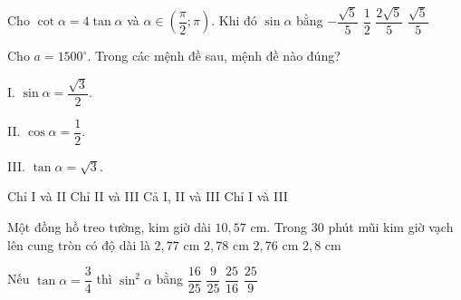 \begin{ex}%
Cho $\cot \alpha =4\tan \alpha$ và $\alpha \in \left(\dfrac{\pi}{2};\pi \right)$. Khi đó $\sin \alpha$ bằng
\choice
{$-\dfrac{\sqrt{5}}{5}$}
{$\dfrac{1}{2}$}
{$\dfrac{2\sqrt{5}}{5}$}
{\True $\dfrac{\sqrt{5}}{5}$}
\end{ex}

\begin{ex}%
Cho $a=1500^\circ$. Trong các mệnh đề sau, mệnh đề nào đúng?
\begin{listEX}[3]
\item[I.] $\sin \alpha =\dfrac{\sqrt{3}}{2}$.
\item[II.] $\cos \alpha =\dfrac{1}{2}$.
\item[III.] $\tan \alpha =\sqrt{3}$.
\end{listEX}
\choice
{Chỉ I và II}
{Chỉ II và III}
{\True Cả I, II và III}
{Chỉ I và III}
\end{ex}

\begin{ex}%
Một đồng hồ treo tường, kim giờ dài $10{,}57$ cm. Trong 30 phút mũi kim giờ vạch lên cung tròn có độ dài là
\choice
{\True $2{,}77$ cm}
{$2{,}78$ cm}
{$2{,}76$ cm}
{$2{,}8$ cm}
\end{ex}

\begin{ex}%
Nếu $\tan \alpha =\dfrac{3}{4}$ thì $\sin ^2\alpha $ bằng
\choice
{$\dfrac{16}{25}$}
{\True $\dfrac{9}{25}$}
{$\dfrac{25}{16}$}
{$\dfrac{25}{9}$}
\end{ex}

